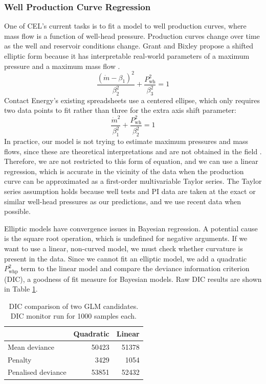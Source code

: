 \documentclass[a4paper, 12pt]{article}
\begin{document}
\subsubsection{Well Production Curve Regression}
One of CEL's current tasks is to fit a model to well production curves, where mass flow is a function of well-head pressure. Production curves change over time as the well and reservoir conditions change. Grant and Bixley propose a shifted elliptic form because it has interpretable real-world parameters of a maximum pressure and a maximum mass flow \cite{Grant:2011}.
\begin{equation}
\frac{\left( \dot{m}-\beta_1 \right)^2}{\beta_2^2} + \frac{P_\text{wh}^2}{\beta_3^2} = 1
\end{equation}
Contact Energy's existing spreadsheets use a centered ellipse, which only requires two data points to fit rather than three for the extra axis shift parameter:
\begin{equation}
\frac{\dot{m}^2}{\beta_1^2} + \frac{P_\text{wh}^2}{\beta_2^2} = 1
\end{equation}
In practice, our model is not trying to estimate maximum pressures and mass flows, since these are theoretical interpretations and are not obtained in the field \cite{Marsh:2015}. Therefore, we are not restricted to this form of equation, and we can use a linear regression, which is accurate in the vicinity of the data when the production curve can be approximated as a first-order multivariable Taylor series. The Taylor series assumption holds because well tests and PI data are taken at the exact or similar well-head pressures as our predictions, and we use recent data when possible.

Elliptic models have convergence issues in Bayesian regression. A potential cause is the square root operation, which is undefined for negative arguments. If we want to use a linear, non-curved model, we must check whether curvature is present in the data. Since we cannot fit an elliptic model, we add a quadratic $P_\text{whp}^2$ term to the linear model and compare the deviance information criterion (DIC), a goodness of fit measure for Bayesian models. Raw DIC results are shown in Table \ref{tab:curvature}.

\begin{table}[ht]
\centering
\begin{tabular}{lrr}
  \hline
& Quadratic & Linear \\ 
  \hline
Mean deviance & 50423 & 51378 \\
Penalty & 3429 & 1054 \\
Penalised deviance & 53851 & 52432\\
   \hline
\end{tabular}
\caption{DIC comparison of two GLM candidates. DIC monitor run for 1000 samples each.} 
\label{tab:curvature}
\end{table}
\end{document}
